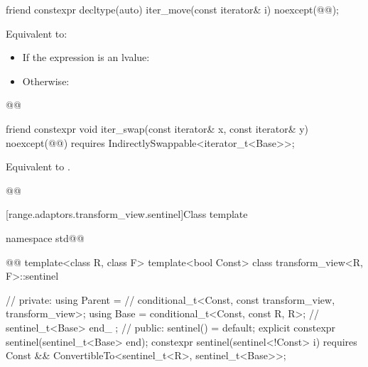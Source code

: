 {
\begin{itemdecl}
friend constexpr decltype(auto) iter_move(const iterator& i)
  noexcept(@\oldtxt{\seebelow}@);
\end{itemdecl}

\begin{itemdescr}
\pnum
\effects Equivalent to:
\begin{itemize}
\item If the expression  is an lvalue:
\item Otherwise: 
\end{itemize}

\pnum
{}
\begin{codeblock}
@@
\end{codeblock}
\end{itemdescr}

\begin{itemdecl}
friend constexpr void iter_swap(const iterator& x, const iterator& y)
  noexcept(@\oldtxt{\seebelow}@)
  requires IndirectlySwappable<iterator_t<Base>>;
\end{itemdecl}

\begin{itemdescr}
\pnum
\effects Equivalent to .

\pnum
{}
\begin{codeblock}
@@
\end{codeblock}
\end{itemdescr}


[range.adaptors.transform_view.sentinel]{Class template }

\pnum
{}

\begin{codeblock}
namespace std@@ { @@
  template<class R, class F>
  template<bool Const>
  class transform_view<R, F>::sentinel { // \expos
  private:
    using Parent =                                 // \expos
      conditional_t<Const, const transform_view, transform_view>;
    using Base = conditional_t<Const, const R, R>; // \expos
    sentinel_t<Base> end_ {};                      // \expos
  public:
    sentinel() = default;
    explicit constexpr sentinel(sentinel_t<Base> end);
    constexpr sentinel(sentinel<!Const> i)
      requires Const && ConvertibleTo<sentinel_t<R>, sentinel_t<Base>>;

}}
\end{codeblock}}
